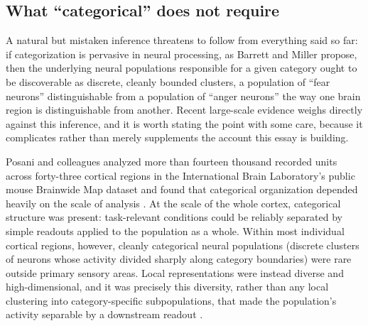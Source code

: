 \documentclass[11pt]{article}
\begin{document}
\subsection{What ``categorical'' does not require}

A natural but mistaken inference threatens to follow from everything said so far: if categorization is pervasive in neural processing, as Barrett and Miller propose, then the underlying neural populations responsible for a given category ought to be discoverable as discrete, cleanly bounded clusters, a population of ``fear neurons'' distinguishable from a population of ``anger neurons'' the way one brain region is distinguishable from another. Recent large-scale evidence weighs directly against this inference, and it is worth stating the point with some care, because it complicates rather than merely supplements the account this essay is building.

Posani and colleagues analyzed more than fourteen thousand recorded units across forty-three cortical regions in the International Brain Laboratory's public mouse Brainwide Map dataset and found that categorical organization depended heavily on the scale of analysis \citep{Posani2026}. At the scale of the whole cortex, categorical structure was present: task-relevant conditions could be reliably separated by simple readouts applied to the population as a whole. Within most individual cortical regions, however, cleanly categorical neural populations (discrete clusters of neurons whose activity divided sharply along category boundaries) were rare outside primary sensory areas. Local representations were instead diverse and high-dimensional, and it was precisely this diversity, rather than any local clustering into category-specific subpopulations, that made the population's activity separable by a downstream readout \citep{Posani2026}.
\end{document}
